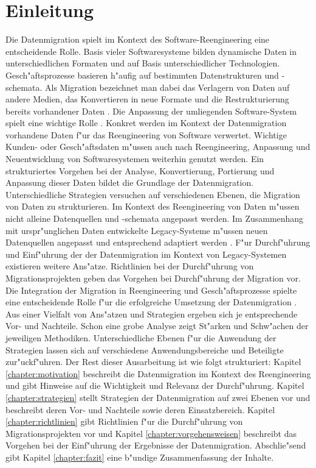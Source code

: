 \section{Einleitung}
\label{chapter:einleitung}


Die Datenmigration spielt im Kontext des Software-Reengineering eine entscheidende Rolle. Basis vieler Softwaresysteme bilden dynamische Daten in unterschiedlichen Formaten und auf Basis unterschiedlicher Technologien. Gesch"aftsprozesse basieren h"aufig auf bestimmten Datenstrukturen und -schemata. Als Migration bezeichnet man dabei das Verlagern von Daten auf andere Medien, das Konvertieren in neue Formate und die Restrukturierung bereits vorhandener Daten \citep{morris-2012}. Die Anpassung der umliegenden Software-System spielt eine wichtige Rolle \cite{henrard-2002}.
\lb
Konkret werden im Kontext der Datenmigration vorhandene Daten f"ur das Reengineering von Software verwertet. Wichtige Kunden- oder Gesch"aftsdaten m"ussen auch nach Reengineering, Anpassung und Neuentwicklung von Softwaresystemen weiterhin genutzt werden. Ein strukturiertes Vorgehen bei der Analyse, Konvertierung, Portierung und Anpassung dieser Daten bildet die Grundlage der Datenmigration.  
\lb
Unterschiedliche Strategien versuchen auf verschiedenen Ebenen, die Migration von Daten zu strukturieren. Im Kontext des Reengineering von Daten m"ussen nicht alleine Datenquellen und -schemata angepasst werden. Im Zusammenhang mit urspr"unglichen Daten entwickelte Legacy-Systeme m"ussen neuen Datenquellen angepasst und entsprechend adaptiert werden \citep{henrard-2002}.	
\lb
F"ur Durchf"uhrung und Einf"uhrung der der Datenmigration im Kontext von Legacy-Systemen existieren weitere Ans"atze. Richtlinien bei der Durchf"uhrung von Migrationsprojekten geben das Vorgehen bei Durchf"uhrung der Migration vor. Die Integration der Migration in Reengineering und Gesch"aftsprozesse spielte eine entscheidende Rolle f"ur die erfolgreiche Umsetzung der Datenmigration \citep{wuLawless-1997} \citep{ackermann-2005}.
\lb
Aus einer Vielfalt von Ans"atzen und Strategien ergeben sich je entsprechende Vor- und Nachteile. Schon eine grobe Analyse zeigt St"arken und Schw"achen der jeweiligen Methodiken. Unterschiedliche Ebenen f"ur die Anwendung der Strategien lassen sich auf verschiedene Anwendungsbereiche und Beteiligte zur"uckf"uhren.
\lb
Der Rest dieser Ausarbeitung ist wie folgt strukturiert: Kapitel \ref{chapter:motivation} beschreibt die Datenmigration im Kontext des Reengineering und gibt Hinweise auf die Wichtigkeit und Relevanz der Durchf"uhrung. Kapitel \ref{chapter:strategien} stellt Strategien der Datenmigration auf zwei Ebenen vor und beschreibt deren Vor- und Nachteile sowie deren Einsatzbereich. Kapitel \ref{chapter:richtlinien} gibt Richtlinien f"ur die Durchf"uhrung von Migrationsprojekten vor und Kapitel \ref{chapter:vorgehensweisen} beschreibt das Vorgehen bei der Einf"uhrung der Ergebnisse der Datenmigration. Abschlie"send gibt Kapitel \ref{chapter:fazit} eine b"undige Zusammenfassung der Inhalte.